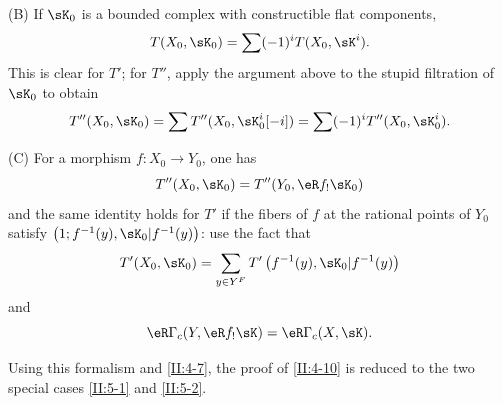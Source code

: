 (B) If $\sK_0$ is a bounded complex with constructible flat components,
\[
  T(X_0,\sK_0) = \sum (-1)^i T(X_0,\sK^i) \text{.}
\]
This is clear for $T'$; for $T''$, apply the argument above to the stupid
filtration of $\sK_0$ to obtain
\[
  T''(X_0,\sK_0) = \sum T''(X_0,\sK_0^i[-i]) = \sum (-1)^i T''(X_0,\sK_0^i) \text{.}
\]

(C) For a morphism $f:X_0\to Y_0$, one has
\[
  T''(X_0,\sK_0) = T''(Y_0,\eR f_! \sK_0)
\]
and the same identity holds for $T'$ if the fibers of $f$ at the rational
points of $Y_0$ satisfy
$\left(1;f^{-1}(y),\sK_0|f^{-1}(y)\right)$: use the fact that
\[
  T'(X_0,\sK_0) = \sum_{y\in Y^F} T'\left(f^{-1}(y), \sK_0|f^{-1}(y)\right)
\]
and
\[
  \eR\Gamma_c(Y, \eR f_! \sK) = \eR\Gamma_c(X,\sK) \text{.}
\]

Using this formalism and \ref{II:4-7}, the proof of \ref{II:4-10} is reduced
to the two special cases \ref{II:5-1} and \ref{II:5-2}.

